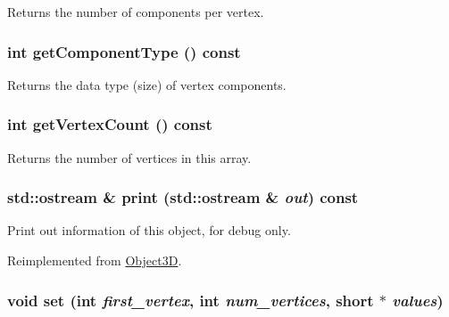 Returns the number of components per vertex. \hypertarget{classm3g_1_1VertexArray_9b7b78fbff0603779ec6bdd2a323c939}{
\subsubsection[{getComponentType}]{\setlength{\rightskip}{0pt plus 5cm}int getComponentType () const}}
\label{classm3g_1_1VertexArray_9b7b78fbff0603779ec6bdd2a323c939}


Returns the data type (size) of vertex components. \hypertarget{classm3g_1_1VertexArray_c1c9b7f5b0dcd9c0310d7e77e10081ba}{
\subsubsection[{getVertexCount}]{\setlength{\rightskip}{0pt plus 5cm}int getVertexCount () const}}
\label{classm3g_1_1VertexArray_c1c9b7f5b0dcd9c0310d7e77e10081ba}


Returns the number of vertices in this array. \hypertarget{classm3g_1_1VertexArray_6fea17fa1532df3794f8cb39cb4f911f}{
\subsubsection[{print}]{\setlength{\rightskip}{0pt plus 5cm}std::ostream \& print (std::ostream \& {\em out}) const}}
\label{classm3g_1_1VertexArray_6fea17fa1532df3794f8cb39cb4f911f}


Print out information of this object, for debug only. 

Reimplemented from \hyperlink{classm3g_1_1Object3D_6fea17fa1532df3794f8cb39cb4f911f}{Object3D}.\hypertarget{classm3g_1_1VertexArray_ac10afe01263d9ac5e7f972a7263de4a}{
\subsubsection[{set}]{\setlength{\rightskip}{0pt plus 5cm}void set (int {\em first\_\-vertex}, \/  int {\em num\_\-vertices}, \/  short $\ast$ {\em values})}}
\label{classm3g_1_1VertexArray_ac10afe01263d9ac5e7f972a7263de4a}


